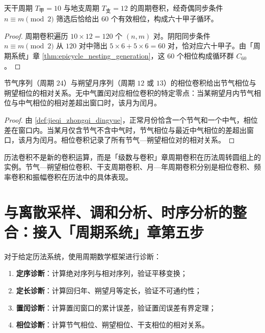 \begin{proposition}[六十甲子的周期卷积生成]\label{prop:ganzhi_periodic_convolution}
天干周期 \(T_{\text{甲}}=10\) 与地支周期 \(T_{\text{支}}=12\) 的周期卷积，经奇偶同步条件 \(n\equiv m\pmod 2\) 筛选后恰给出 \(60\) 个有效相位，构成六十甲子循环。
\end{proposition}

\begin{proof}
周期卷积遍历 \(10\times 12=120\) 个 \((n,m)\) 对。阴阳同步条件 \(n\equiv m\pmod 2\) 从 \(120\) 对中筛出 \(5\times 6+5\times 6=60\) 对，恰对应六十甲子。由「周期系统」章 \cref{thm:epicycle_nesting_generation}，这 \(60\) 个相位构成循环群 \(C_{60}\)。
\end{proof}

\begin{proposition}[节气与朔望的相位卷积]\label{prop:jieqi_synodic_phase_convolution}
节气序列（周期 \(24\)）与朔望月序列（周期 \(12\) 或 \(13\)）的相位卷积给出节气相位与朔望相位的相对关系。无中气置闰对应相位卷积的特定零点：当某朔望月内节气相位与中气相位的相对差超出窗口时，该月为闰月。
\end{proposition}

\begin{proof}
由 \cref{def:jieqi_zhongqi_dingyue}，正常月份恰含一个节气和一个中气，相位差在窗口内。当某月仅含节气不含中气时，节气相位与最近中气相位的差超出窗口，该月为闰月。相位卷积记录了所有节气—朔望相位对的相对关系。
\end{proof}

\begin{remark}[历法卷积与周期卷积的关系]\label{rem:calendar_convolution_relation}
历法卷积不是新的卷积运算，而是「级数与卷积」章周期卷积在历法周转圆组上的实例。节气—朔望相位卷积、干支周期卷积、月—年周期卷积分别是相位卷积、频率卷积和振幅卷积在历法中的具体表现。
\end{remark}

\section{与离散采样、调和分析、时序分析的整合：接入「周期系统」章第五步}
\label{sec:calendar_integration}

\begin{definition}[历法周期诊断流程]\label{def:calendar_periodic_diagnosis}
对于给定历法系统，使用周期数学框架进行诊断：
\begin{enumerate}[label=(\roman*)]
    \item \textbf{定序诊断}：计算绝对序列与相对序列，验证平移变换；
    \item \textbf{定长诊断}：计算回归年、朔望月等定长，验证不可通约性；
    \item \textbf{置闰诊断}：计算置闰窗口的累计误差，验证置闰误差有界定理；
    \item \textbf{相位诊断}：计算节气相位、朔望相位、干支相位的相对关系。
\end{enumerate}
\end{definition}

